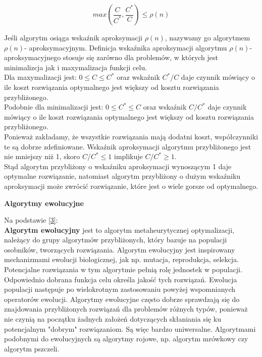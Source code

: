 \documentclass[a4paper, twoside, 12pt, justified]{article}
\begin{document}
	\begin{equation}
		max \left(\frac{C}{C^*}, \frac{C^*}{C}\right) \leq \rho(n) 
	\end{equation}
	
	Jeśli algorytm osiąga wskaźnik aproksymacji $\rho(n)$, nazywamy go algorytmem $\rho(n)$- aproksymacyjnym. Definicja wskaźnika aproksymacji algorytmu $\rho(n)$- aproksymacyjnego stosuje się zarówno dla problemów, w których jest minimalizcja jak i maxymalizacja funkcji celu.\\
	Dla maxymalizacji jest: $0 \le C \leq C^*$ oraz wskaźnik $C^*/C$ daje czynnik mówiący o ile koszt rozwiązania optymalnego jest większy od kosztu rozwiązania przybliżonego.\\
	Podobnie dla minimalizacji jest: $0 \le C^* \leq C$ oraz wskaźnik $C/C^*$ daje czynnik mówiący o ile koszt rozwiązania optymalnego jest większy od kosztu rozwiązania przybliżonego.\\
	Ponieważ zakładamy, że wszystkie rozwiązania mają dodatni koszt, współczynniki te są dobrze zdefiniowane. Wskaźnik aproksymacji algorytmu przybliżonego jest nie mniejszy niż 1, skoro $C/C^* \leq 1$ implikuje $C/C^* \geq 1$.\\
	Stąd algorytm przybliżony o wskaźniku aproksymacji wynoszącym 1 daje optymalne rozwiązanie, natomiast algorytm przybliżony o dużym wskaźniku aproksymacji może zwrócić rozwiązanie, które jest o wiele gorsze od optymalnego.\\
	
	\newpage
	
	
	\begin{large}
		\begin{center}
			\textbf{Algorytmy ewolucyjne}
		\end{center}
	\end{large}

	Na podstawie \hyperlink{evolutionaryalgorithm}{[3]}:\\
	\textbf{Algorytm ewolucyjny} jest to algorytm metaheurytycznej optymalizacji, należący do grupy algorytmów przybliżonych, który bazuje na populacji osobników, tworzących rozwiązania. Algorytm ewolucyjny jest inspirowany mechanizmami ewolucji biologicznej, jak np. mutacja, reprodukcja, selekcja. Potencjalne rozwiązania w tym algorytmie pełnią rolę jednostek w populacji. Odpowiednio dobrana funkcja celu określa jakość tych rozwiązań. Ewolucja populacji następuje po wielokrotnym zastosowaniu powyżej wspomnianych operatorów ewolucji. Algorytmy ewolucyjne często dobrze sprawdzają się do znajdowania przybliżonych rozwiązań dla problemów różnych typów, ponieważ nie czynią na początku żadnych założeń dotyczących skłaniania się ku potencjalnym "dobrym" rozwiązaniom. Są więc bardzo uniwersalne. Algorytmami podobnymi do ewolucyjnych są algorytmy rojowe, np. algorytm mrówkowy czy algorytm pszczeli.\\
	
\end{document}
